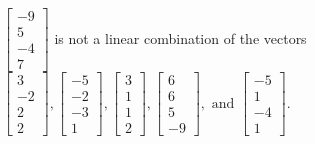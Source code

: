 \begin{exercise}
\begin{exerciseStatement}
  \end{exerciseStatement}
  \begin{exerciseAnswer}
   \(\left[\begin{array}{c}
-9 \\
5 \\
-4 \\
7
\end{array}\right]\) 
  	 is not  
	a linear combination of the vectors \(\left[\begin{array}{c}
3 \\
-2 \\
2 \\
2
\end{array}\right] , \left[\begin{array}{c}
-5 \\
-2 \\
-3 \\
1
\end{array}\right] , \left[\begin{array}{c}
3 \\
1 \\
1 \\
2
\end{array}\right] , \left[\begin{array}{c}
6 \\
6 \\
5 \\
-9
\end{array}\right] , \text{ and } \left[\begin{array}{c}
-5 \\
1 \\
-4 \\
1
\end{array}\right]\).

	
  


  \end{exerciseAnswer}
\end{exercise}